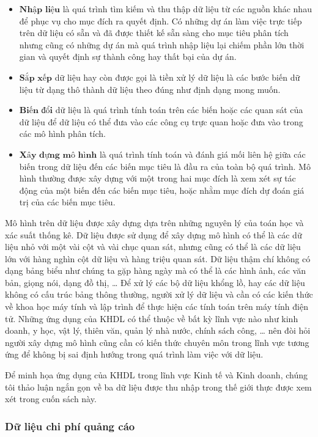 \documentclass[
]{article}
\begin{document}
\begin{itemize}
\item
  \(\textbf{Nhập liệu}\) là quá trình tìm kiếm và thu thập dữ liệu từ các nguồn khác nhau để phục vụ cho mục đích ra quyết định. Có những dự án làm việc trực tiếp trên dữ liệu có sẵn và đã được thiết kế sẵn sàng cho mục tiêu phân tích nhưng cũng có những dự án mà quá trình nhập liệu lại chiếm phần lớn thời gian và quyết định sự thành công hay thất bại của dự án.
\item
  \(\textbf{Sắp xếp}\) dữ liệu hay còn được gọi là tiền xử lý dữ liệu là các bước biến dữ liệu từ dạng thô thành dữ liệu theo đúng như định dạng mong muốn.
\item
  \(\textbf{Biến đổi}\) dữ liệu là quá trình tính toán trên các biến hoặc các quan sát của dữ liệu để dữ liệu có thể đưa vào các công cụ trực quan hoặc đưa vào trong các mô hình phân tích.
\item
  \(\textbf{Xây dựng mô hình}\) là quá trình tính toán và đánh giá mối liên hệ giữa các biến trong dữ liệu đến các biến mục tiêu là đầu ra của toàn bộ quá trình. Mô hình thường được xây dựng với một trong hai mục đích là xem xét sự tác động của một biến đến các biến mục tiêu, hoặc nhằm mục đích dự đoán giá trị của các biến mục tiêu.
\end{itemize}

Mô hình trên dữ liệu được xây dựng dựa trên những nguyên lý của toán học và xác suất thống kê. Dữ liệu được sử dụng để xây dựng mô hình có thể là các dữ liệu nhỏ với một vài cột và vài chục quan sát, nhưng cũng có thể là các dữ liệu lớn với hàng nghìn cột dữ liệu và hàng triệu quan sát. Dữ liệu thậm chí không có dạng bảng biểu như chúng ta gặp hàng ngày mà có thể là các hình ảnh, các văn bản, giọng nói, dạng đồ thị, \ldots{} Để xử lý các bộ dữ liệu khổng lồ, hay các dữ liệu không có cấu trúc bảng thông thường, người xử lý dữ liệu và cần có các kiến thức về khoa học máy tính và lập trình để thực hiện các tính toán trên máy tính điện tử. Những ứng dụng của KHDL có thể thuộc về bất kỳ lĩnh vực nào như kinh doanh, y học, vật lý, thiên văn, quản lý nhà nước, chính sách công, \ldots{} nên đòi hỏi người xây dựng mô hình cũng cần có kiến thức chuyên môn trong lĩnh vực tương ứng để không bị sai định hướng trong quá trình làm việc với dữ liệu.

Để minh họa ứng dụng của KHDL trong lĩnh vực Kinh tế và Kinh doanh, chúng tôi thảo luận ngắn gọn về ba dữ liệu được thu nhập trong thế giới thực được xem xét trong cuốn sách này.

\hypertarget{dux1eef-liux1ec7u-chi-phuxed-quux1ea3ng-cuxe1o}{%
\subsubsection{Dữ liệu chi phí quảng cáo}\label{dux1eef-liux1ec7u-chi-phuxed-quux1ea3ng-cuxe1o}}
\end{document}
